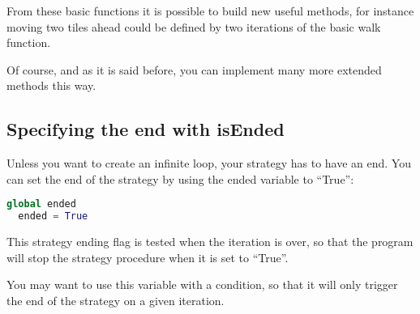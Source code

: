 \documentclass[a4paper,11pt]{article}
\begin{document}
From these basic functions it is possible to build new useful methods,
for instance moving two tiles ahead could be defined by two iterations
of the basic walk function.

Of course, and as it is said before, you can implement many more
extended methods this way.

\subsection{Specifying the end with isEnded}

Unless you want to create an infinite loop, your strategy has to have
an end. You can set the end of the strategy by using the ended
variable to ``True'':

\begin{lstlisting}[language=Python]
  global ended
  ended = True
\end{lstlisting}

This strategy ending flag is tested when the iteration is over, so
that the program will stop the strategy procedure when it is set to
``True''.

You may want to use this variable with a condition, so that it will
only trigger the end of the strategy on a given iteration.



\end{document}
